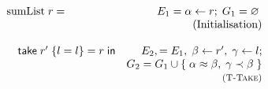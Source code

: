 \begin{figure}
    \centering
    \[
        \begin{array}{lr}
            \text{sumList}\; r =
                & E_1 = \alpha \leftarrow r;\; G_1 = \varnothing\; \\
                & \text{(Initialisation)} \\
                \\
            \hspace{1em}    \textsf{take}\; r'\; \{ l = l \} = r\; \textsf{in} 
                & E_2, = E_1,\; \beta \leftarrow r',\; \gamma \leftarrow l;  \\
                & G_2 = G_1 \cup \{\; \alpha \approx \beta,\; \gamma \prec \beta\; \} \\
                & \textsc{\footnotesize (T-Take)}\\


\end{array}\]
\end{figure}
